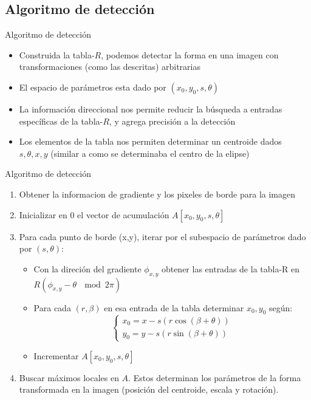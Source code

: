 \documentclass{beamer}
\begin{document}
\subsection{Algoritmo de detección}
\begin{frame}{Algoritmo de detección}
\begin{itemize}
    \item Construida la tabla-$R$, podemos detectar la forma en una imagen con transformaciones (como las descritas) arbitrarias
    \item El espacio de parámetros esta dado por $(x_0, y_0, s, \theta)$ 
    \item La información direccional nos permite reducir la búsqueda a entradas específicas de la tabla-$R$, y agrega precisión a la detección
    \item Los elementos de la tabla nos permiten determinar un centroide dados $s, \theta, x, y$ (similar a como se determinaba el centro de la elipse) 
\end{itemize}
\end{frame}
\begin{frame}{Algoritmo de detección}
    \begin{enumerate}
        \item Obtener la informacion de gradiente y los pixeles de borde para la imagen
        \item Inicializar en $0$ el vector de acumulación $A[x_0, y_0, s, \theta]$
        \item Para cada punto de borde (x,y), iterar por el subespacio de parámetros dado por $(s, \theta)$:
        \begin{itemize}
            \item Con la direción del gradiente $\phi_{x,y}$ obtener las entradas de la tabla-R en $R(\phi_{x,y} - \theta\ \mod 2\pi)$
            \item Para cada $(r, \beta)$ en esa entrada de la tabla determinar $x_0, y_0$ según:
                    \[ \begin{cases}
                      x_0 = x - s (r \cos (\beta + \theta))\\    
                      y_0 = y - s (r \sin (\beta + \theta))
                  \end{cases} \]
            \item Incrementar $A[x_0, y_0, s, \theta]$
        \end{itemize}
  \item Buscar máximos locales en $A$. Estos determinan los parámetros de la forma transformada en la imagen (posición del centroide, escala y rotación). 
    \end{enumerate}
    
\end{frame}
\end{document}
